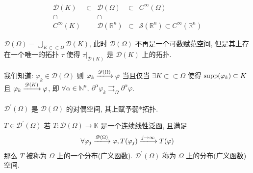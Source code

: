 \documentclass[11pt]{ctexart}[UTF8]
\begin{document}
\[
\begin{array}{ccccc}
\mathscr{D}(K) & \subset & \mathscr{D}(\Omega) & \subset & C^\infty(\Omega) \\
\cap & & \cap & & \\
C^\infty(K) & & \mathscr{D}(\mathbb{R}^n) & \subset & \mathscr{S}(\mathbb{R}^n) \subset C^\infty(\mathbb{R}^n)
\end{array}
\]
\begin{remark}
    $\mathscr{D}(\Omega) = \bigcup_{K \subset\subset \Omega} \mathscr{D}(K)$, 此时 $\mathscr{D}(\Omega)$ 不再是一个可数赋范空间,
    但是其上存在一个唯一的拓扑 $\tau$ 使得 $\tau\big|_{\mathscr{D}(K)}$ 是 $\mathscr{D}(K)$ 上的拓扑.
\end{remark}
我们知道: $\varphi_{k} \in \mathscr{D}(\Omega)$ 则 $\varphi_{k} \xlongrightarrow{\mathscr{D}(\Omega)} \varphi$ 当且仅当 $\exists K \subset\subset \Omega$ 
使得 $\operatorname{supp}(\varphi_{k}) \subset K$ 且 $\varphi_{k} \xlongrightarrow{\mathscr{D}(K)} \varphi$, 即 $\forall \alpha \in \mathbb{N}^{n},\ \partial^{\alpha} \varphi_{k} \rightrightarrows_{\Omega} \partial^{\alpha} \varphi$.\\
~\\
$\mathscr{D}^{\prime}(\Omega)$ 是 $\mathscr{D}(\Omega)$ 的对偶空间, 其上赋予弱*拓扑.
\begin{definition}[分布/广义函数空间]
    $T \in \mathscr{D}^{\prime}(\Omega)$ 若 $T: \mathscr{D}(\Omega) \longrightarrow \mathbb{K}$ 是一个连续线性泛函, 且满足
\begin{equation*}
    \forall \varphi_{j} \xlongrightarrow{\mathscr{D}(\Omega)} \varphi, T(\varphi_{j}) \xlongrightarrow{j \to \infty} T(\varphi) 
\end{equation*}
那么 $T$ 被称为 $\Omega$ 上的一个分布(广义函数). $\mathscr{D}^{\prime}(\Omega)$ 称为 $\Omega$ 上的分布(广义函数)空间.
\end{definition}
\end{document}

